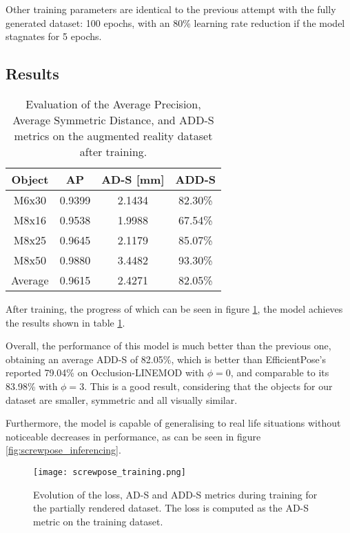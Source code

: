 Other training parameters are identical to the previous attempt with the fully generated dataset: 100 epochs, with an 80\% learning rate reduction if the model stagnates for 5 epochs.

\subsection{Results}

\begin{table}[ht]
    \begin{center}
        \begin{tabular}{|c||c|c|c|}
            \hline
            Object & AP & AD-S [mm] & ADD-S \\
            \hline \hline
            M6x30 & 0.9399 & 2.1434 & 82.30\% \\
            M8x16 & 0.9538 & 1.9988 & 67.54\% \\
            M8x25 & 0.9645 & 2.1179 & 85.07\% \\
            M8x50 & 0.9880 & 3.4482 & 93.30\% \\
            \hline \hline
            Average & 0.9615 & 2.4271 & 82.05\% \\
            \hline    
        \end{tabular}
        \caption{Evaluation of the Average Precision, Average Symmetric Distance, and ADD-S metrics on the augmented reality dataset after training.}
        \label{tab:screwpose}
    \end{center}
\end{table}

After training, the progress of which can be seen in figure \ref{fig:screwpose_training}, the model achieves the results shown in table \ref{tab:screwpose}.

Overall, the performance of this model is much better than the previous one, obtaining an average ADD-S of 82.05\%, which is better than EfficientPose's reported 79.04\% on Occlusion-LINEMOD with $\phi=0$, and comparable to its 83.98\% with $\phi = 3$. This is a good result, considering that the objects for our dataset are smaller, symmetric and all visually similar.

Furthermore, the model is capable of generalising to real life situations without noticeable decreases in performance, as can be seen in figure \ref{fig:screwpose_inferencing}.

\begin{figure}[ht]
    \texttt{[image: screwpose\_training.png]}
    \caption{Evolution of the loss, AD-S and ADD-S metrics during training for the partially rendered dataset. The loss is computed as the AD-S metric on the training dataset.}
    \label{fig:screwpose_training}
\end{figure}

